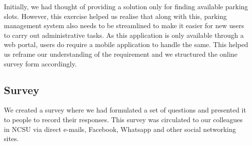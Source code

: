 \documentclass{acm_proc_article-sp}
\begin{document}
Initially, we had thought of providing a solution only for finding available parking slots. However, this exercise helped us realise that along with this, parking management system also needs to be streamlined to make it easier for new users to carry out administrative tasks. As this application is only available through a web portal, users do require a mobile application to handle the same. This helped us reframe our understanding of the requirement and we structured the online survey form accordingly.

\subsection{Survey} 
We created a survey\cite{gooform} where we had formulated a set of questions and presented it to people to record their responses. This survey was circulated to our colleagues in NCSU via direct e-mails, Facebook, Whatsapp and other social networking sites.
\end{document}

